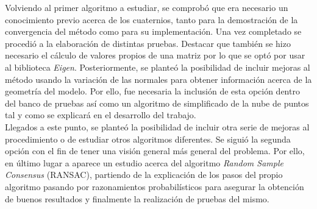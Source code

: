 Volviendo al primer algoritmo a estudiar, se comprobó que era necesario un conocimiento previo acerca de los cuaternios, tanto para la demostración de la convergencia del método como para su implementación. Una vez completado se procedió a la elaboración de distintas pruebas. Destacar que también se hizo necesario el cálculo de valores propios de una matriz por lo que se optó por usar al biblioteca \textit{Eigen}. Posteriormente, se planteó la posibilidad de incluir mejoras al método usando la variación de las normales para obtener información acerca de la geometría del modelo. Por ello, fue necesaria la inclusión de esta opción dentro del banco de pruebas así como un algoritmo de simplificado de la nube de puntos tal y como se explicará en el desarrollo del trabajo. \\

Llegados a este punto, se planteó la posibilidad de incluir otra serie de mejoras al procedimiento o de estudiar otros algoritmos diferentes. Se siguió la segunda opción con el fin de tener una visión general más general del problema. Por ello, en último lugar a aparece un estudio acerca del algoritmo \textit{Random Sample Consensus} (RANSAC), partiendo de la explicación de los pasos del propio algoritmo pasando por razonamientos probabilísticos para asegurar la obtención de buenos resultados y finalmente la realización de pruebas del mismo.